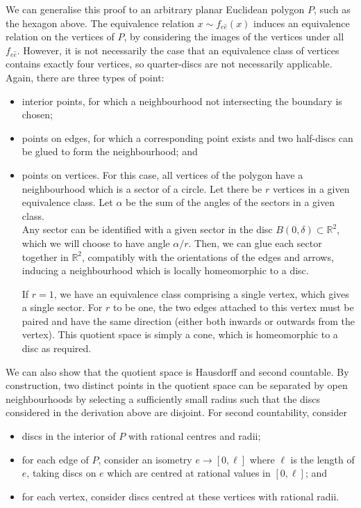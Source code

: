 \begin{example}
	We can generalise this proof to an arbitrary planar Euclidean polygon $P$, such as the hexagon above.
	The equivalence relation $x \sim f_{e \hat e}(x)$ induces an equivalence relation on the vertices of $P$, by considering the images of the vertices under all $f_{e\hat e}$.
	However, it is not necessarily the case that an equivalence class of vertices contains exactly four vertices, so quarter-discs are not necessarily applicable.
	Again, there are three types of point:
	\begin{itemize}
		\item interior points, for which a neighbourhood not intersecting the boundary is chosen;
		\item points on edges, for which a corresponding point exists and two half-discs can be glued to form the neighbourhood; and
		\item points on vertices.
		      For this case, all vertices of the polygon have a neighbourhood which is a sector of a circle.
		      Let there be $r$ vertices in a given equivalence class.
		      Let $\alpha$ be the sum of the angles of the sectors in a given class. \\
		      Any sector can be identified with a given sector in the disc $B(0,\delta) \subset \mathbb R^2$, which we will choose to have angle $\alpha / r$.
		      Then, we can glue each sector together in $\mathbb R^2$, compatibly with the orientations of the edges and arrows, inducing a neighbourhood which is locally homeomorphic to a disc.

		      If $r = 1$, we have an equivalence class comprising a single vertex, which gives a single sector.
		      For $r$ to be one, the two edges attached to this vertex must be paired and have the same direction (either both inwards or outwards from the vertex).
		      This quotient space is simply a cone, which is homeomorphic to a disc as required.
	\end{itemize}
	We can also show that the quotient space is Hausdorff and second countable.
	By construction, two distinct points in the quotient space can be separated by open neighbourhoods by selecting a sufficiently small radius such that the discs considered in the derivation above are disjoint.
	For second countability, consider
	\begin{itemize}
		\item discs in the interior of $P$ with rational centres and radii;
		\item for each edge of $P$, consider an isometry $e \to [0, \ell]$ where $\ell$ is the length of $e$, taking discs on $e$ which are centred at rational values in $[0,\ell]$; and
		\item for each vertex, consider discs centred at these vertices with rational radii.
	\end{itemize}
\end{example}

